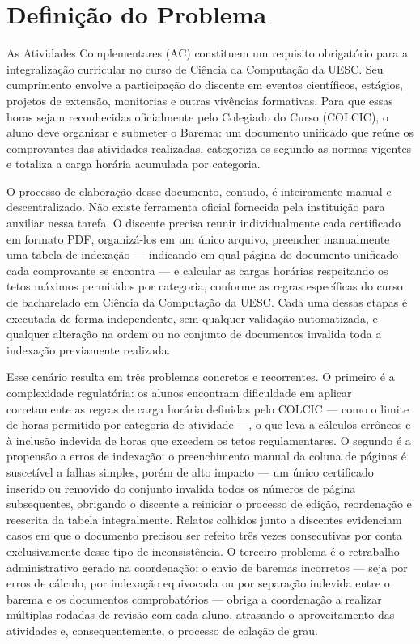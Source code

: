 \chapter{Definição do Problema}
As Atividades Complementares (AC) constituem um requisito obrigatório para a integralização curricular no curso de Ciência da Computação da UESC. Seu cumprimento envolve a participação do discente em eventos científicos, estágios, projetos de extensão, monitorias e outras vivências formativas. Para que essas horas sejam reconhecidas oficialmente pelo Colegiado do Curso (COLCIC), o aluno deve organizar e submeter o Barema: um documento unificado que reúne os comprovantes das atividades realizadas, categoriza-os segundo as normas vigentes e totaliza a carga horária acumulada por categoria.

O processo de elaboração desse documento, contudo, é inteiramente manual e descentralizado. Não existe ferramenta oficial fornecida pela instituição para auxiliar nessa tarefa. O discente precisa reunir individualmente cada certificado em formato PDF, organizá-los em um único arquivo, preencher manualmente uma tabela de indexação — indicando em qual página do documento unificado cada comprovante se encontra — e calcular as cargas horárias respeitando os tetos máximos permitidos por categoria, conforme as regras específicas do curso de bacharelado em Ciência da Computação da UESC. Cada uma dessas etapas é executada de forma independente, sem qualquer validação automatizada, e qualquer alteração na ordem ou no conjunto de documentos invalida toda a indexação previamente realizada.


Esse cenário resulta em três problemas concretos e recorrentes. O primeiro é a complexidade regulatória: os alunos encontram dificuldade em aplicar corretamente as regras de carga horária definidas pelo COLCIC — como o limite de horas permitido por categoria de atividade —, o que leva a cálculos errôneos e à inclusão indevida de horas que excedem os tetos regulamentares. O segundo é a propensão a erros de indexação: o preenchimento manual da coluna de páginas é suscetível a falhas simples, porém de alto impacto — um único certificado inserido ou removido do conjunto invalida todos os números de página subsequentes, obrigando o discente a reiniciar o processo de edição, reordenação e reescrita da tabela integralmente. Relatos colhidos junto a discentes evidenciam casos em que o documento precisou ser refeito três vezes consecutivas por conta exclusivamente desse tipo de inconsistência. O terceiro problema é o retrabalho administrativo gerado na coordenação: o envio de baremas incorretos — seja por erros de cálculo, por indexação equivocada ou por separação indevida entre o barema e os documentos comprobatórios — obriga a coordenação a realizar múltiplas rodadas de revisão com cada aluno, atrasando o aproveitamento das atividades e, consequentemente, o processo de colação de grau.

